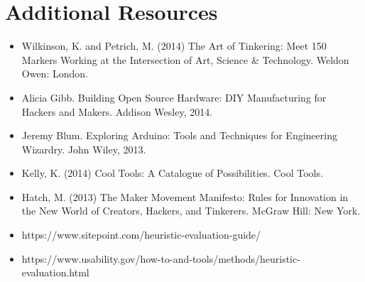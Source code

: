 \documentclass{../fal_assignment}
\begin{document}
\section*{Additional Resources}

\begin{itemize}
     \item Wilkinson, K. and Petrich, M. (2014) The Art of Tinkering: Meet 150 Markers Working at the Intersection of Art, Science \& Technology. Weldon Owen: London.
    \item Alicia Gibb. Building Open Source Hardware: DIY Manufacturing for Hackers and Makers. Addison Wesley, 2014. 
    \item Jeremy Blum. Exploring Arduino: Tools and Techniques for Engineering Wizardry. John Wiley, 2013. 
    \item Kelly, K. (2014) Cool Tools: A Catalogue of Possibilities. Cool Tools.
    \item Hatch, M. (2013) The Maker Movement Manifesto: Rules for Innovation in the New World of Creators, Hackers, and Tinkerers. McGraw Hill: New York.
    \item https://www.sitepoint.com/heuristic-evaluation-guide/
    \item https://www.usability.gov/how-to-and-tools/methods/heuristic-evaluation.html
    
\end{itemize}

\end{document}
